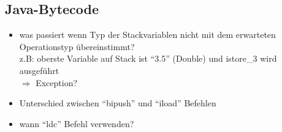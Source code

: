 \subsection{Java-Bytecode}
\begin{itemize}
	\item was passiert wenn Typ der Stackvariablen nicht mit dem erwarteten Operationstyp übereinstimmt?\\
		z.B: oberste Variable auf Stack ist \enquote{3.5} (Double) und istore\_3 wird ausgeführt\\
		$\Rightarrow$ Exception?
	\item Unterschied zwischen \enquote{bipush} und \enquote{iload} Befehlen
	\item wann \enquote{ldc} Befehl verwenden? 
\end{itemize} 